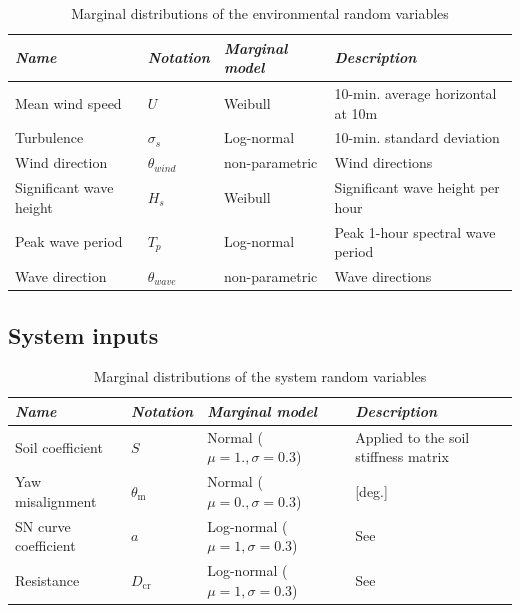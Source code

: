 \begin{table}[h!]
    \centering
    \begin{tabular}{ l l l l}
        \hline
        {\it Name} & {\it Notation} & {\it Marginal model} & {\it Description}\\
        \hline
        Mean wind speed & $U$ & Weibull & 10-min. average horizontal at 10m\\
        Turbulence & $\sigma_s $ & Log-normal & 10-min.  standard deviation \\
        Wind direction & $\theta_{wind} $ & non-parametric & Wind directions\\
        Significant wave height & $H_s $ & Weibull & Significant wave height per hour\\
        Peak wave period & $T_p $ & Log-normal & Peak 1-hour spectral wave period \\
        Wave direction & $\theta_{wave} $ & non-parametric & Wave directions\\
        \hline
    \end{tabular}
    \caption{Marginal distributions of the environmental random variables}
    \label{tab:envi_variables}
\end{table}

\subsection{System inputs}

\begin{table}[h!]
    \centering
    \begin{tabular}{ l l l l}
        \hline
        {\it Name} & {\it Notation} & {\it Marginal model} & {\it Description}\\
        \hline
        Soil coefficient & $S$ & Normal ($\mu=1., \sigma=0.3$) & Applied to the soil stiffness matrix\\
        Yaw misalignment & $\theta_{\mathrm{m}}$ & Normal ($\mu=0., \sigma=0.3$) & [deg.] \\
        SN curve coefficient & $a$ & Log-normal ($\mu=1, \sigma=0.3$) & See \cite{guede_2007}\\
        Resistance & $D_{\mathrm{cr}}$ & Log-normal ($\mu=1, \sigma=0.3$) & See \cite{drexler_musculus_2021}\\\hline
    \end{tabular}
    \caption{Marginal distributions of the system random variables}
    \label{tab:sys_variables}
\end{table}

